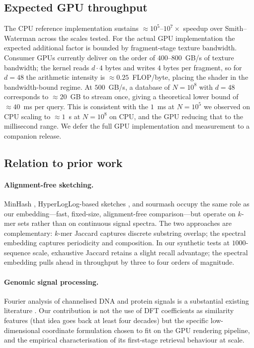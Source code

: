 \documentclass[twocolumn,11pt,a4paper]{article}
\theoremstyle{definition}
\theoremstyle{remark}
\begin{document}
\subsection{Expected GPU throughput}
\label{sec:discussion:gpu}

The CPU reference implementation sustains $\approx 10^5$--$10^7\times$
speedup over Smith--Waterman across the scales tested. For the actual GPU
implementation the expected additional factor is bounded by fragment-stage
texture bandwidth. Consumer GPUs currently deliver on the order of
$400$--$800$~GB/s of texture bandwidth; the kernel reads $d \cdot 4$ bytes
and writes $4$ bytes per fragment, so for $d = 48$ the arithmetic intensity
is $\approx 0.25$~FLOP/byte, placing the shader in the bandwidth-bound
regime. At $500$~GB/s, a database of $N = 10^8$ with $d = 48$ corresponds
to $\approx 20$~GB to stream once, giving a theoretical lower bound of
$\approx 40$~ms per query. This is consistent with the $1$~ms at $N = 10^5$
we observed on CPU scaling to $\approx 1$~s at $N = 10^8$ on CPU, and the
GPU reducing that to the millisecond range. We defer the full GPU
implementation and measurement to a companion release.

\subsection{Relation to prior work}
\label{sec:related}

\paragraph{Alignment-free sketching.} MinHash \citep{broder1997,ondov2016},
HyperLogLog-based sketches \citep{flajolet2007,baker2019}, and sourmash
\citep{pierce2019} occupy the same role as our embedding---fast,
fixed-size, alignment-free comparison---but operate on $k$-mer sets rather
than on continuous signal spectra. The two approaches are complementary:
$k$-mer Jaccard captures discrete substring overlap; the spectral
embedding captures periodicity and composition. In our synthetic tests
at $1000$-sequence scale, exhaustive Jaccard retains a slight recall
advantage; the spectral embedding pulls ahead in throughput by three to
four orders of magnitude.

\paragraph{Genomic signal processing.} Fourier analysis of channelised DNA
and protein signals is a substantial existing literature
\citep{voss1992,anastassiou2001,trifonov1980,hoang2015,yin2014}. Our
contribution is not the use of DFT coefficients as similarity features
(that idea goes back at least four decades) but the specific low-dimensional
coordinate formulation chosen to fit on the GPU rendering pipeline, and
the empirical characterisation of its first-stage retrieval behaviour at
scale.
\end{document}
